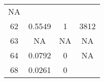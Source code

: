 \documentclass[]{article}
\begin{document}
\begin{longtable}[]{@{}cccc@{}}
\begin{minipage}[t]{0.17\columnwidth}
NA\strut
\end{minipage}\tabularnewline
\begin{minipage}[t]{0.10\columnwidth}\centering\strut
62\strut
\end{minipage} & \begin{minipage}[t]{0.25\columnwidth}\centering\strut
0.5549\strut
\end{minipage} & \begin{minipage}[t]{0.17\columnwidth}\centering\strut
1\strut
\end{minipage} & \begin{minipage}[t]{0.17\columnwidth}\centering\strut
3812\strut
\end{minipage}\tabularnewline
\begin{minipage}[t]{0.10\columnwidth}\centering\strut
63\strut
\end{minipage} & \begin{minipage}[t]{0.25\columnwidth}\centering\strut
NA\strut
\end{minipage} & \begin{minipage}[t]{0.17\columnwidth}\centering\strut
NA\strut
\end{minipage} & \begin{minipage}[t]{0.17\columnwidth}\centering\strut
NA\strut
\end{minipage}\tabularnewline
\begin{minipage}[t]{0.10\columnwidth}\centering\strut
64\strut
\end{minipage} & \begin{minipage}[t]{0.25\columnwidth}\centering\strut
0.0792\strut
\end{minipage} & \begin{minipage}[t]{0.17\columnwidth}\centering\strut
0\strut
\end{minipage} & \begin{minipage}[t]{0.17\columnwidth}\centering\strut
NA\strut
\end{minipage}\tabularnewline
\begin{minipage}[t]{0.10\columnwidth}\centering\strut
68\strut
\end{minipage} & \begin{minipage}[t]{0.25\columnwidth}\centering\strut
0.0261\strut
\end{minipage} & \begin{minipage}[t]{0.17\columnwidth}\centering\strut
0\strut
\end{minipage} & \begin{minipage}[t]{0.17\columnwidth}\centering\strut

\end{minipage}
\end{longtable}
\end{document}
